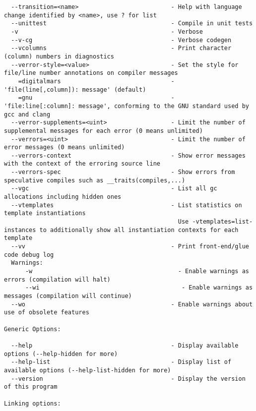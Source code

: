 \documentclass{studrep}
\begin{document}
\begin{verbatim}
  --transition=<name>                          - Help with language change identified by <name>, use ? for list
  --unittest                                   - Compile in unit tests
  -v                                           - Verbose
  --v-cg                                       - Verbose codegen
  --vcolumns                                   - Print character (column) numbers in diagnostics
  --verror-style=<value>                       - Set the style for file/line number annotations on compiler messages
    =digitalmars                               -   'file(line[,column]): message' (default)
    =gnu                                       -   'file:line[:column]: message', conforming to the GNU standard used by gcc and clang
  --verror-supplements=<uint>                  - Limit the number of supplemental messages for each error (0 means unlimited)
  --verrors=<uint>                             - Limit the number of error messages (0 means unlimited)
  --verrors-context                            - Show error messages with the context of the erroring source line
  --verrors-spec                               - Show errors from speculative compiles such as __traits(compiles,...)
  --vgc                                        - List all gc allocations including hidden ones
  --vtemplates                                 - List statistics on template instantiations
                                                 Use -vtemplates=list-instances to additionally show all instantiation contexts for each template
  --vv                                         - Print front-end/glue code debug log
  Warnings:
      -w                                         - Enable warnings as errors (compilation will halt)
      --wi                                        - Enable warnings as messages (compilation will continue)
  --wo                                         - Enable warnings about use of obsolete features

Generic Options:

  --help                                       - Display available options (--help-hidden for more)
  --help-list                                  - Display list of available options (--help-list-hidden for more)
  --version                                    - Display the version of this program

Linking options:


\end{verbatim}
\end{document}
